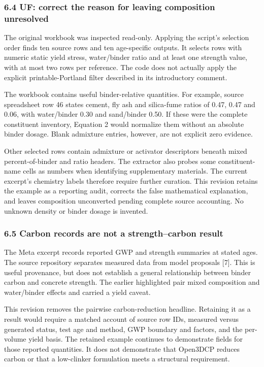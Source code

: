 \documentclass[
  american,
  11pt,
  letterpaper,
]{article}
\begin{document}
\subsubsection{6.4 UF: correct the reason for leaving composition
unresolved}\label{uf-correct-the-reason-for-leaving-composition-unresolved}

The original workbook was inspected read-only. Applying the script's
selection order finds ten source rows and ten age-specific outputs. It
selects rows with numeric static yield stress, water/binder ratio and at
least one strength value, with at most two rows per reference. The code
does not actually apply the explicit printable-Portland filter described
in its introductory comment.

The workbook contains useful binder-relative quantities. For example,
source spreadsheet row 46 states cement, fly ash and silica-fume ratios
of 0.47, 0.47 and 0.06, with water/binder 0.30 and sand/binder 0.50. If
these were the complete constituent inventory, Equation 2 would
normalize them without an absolute binder dosage. Blank admixture
entries, however, are not explicit zero evidence.

Other selected rows contain admixture or activator descriptors beneath
mixed percent-of-binder and ratio headers. The extractor also probes
some constituent-name cells as numbers when identifying supplementary
materials. The current excerpt's chemistry labels therefore require
further curation. This revision retains the example as a reporting
audit, corrects the false mathematical explanation, and leaves
composition unconverted pending complete source accounting. No unknown
density or binder dosage is invented.

\subsubsection{6.5 Carbon records are not a strength--carbon
result}\label{carbon-records-are-not-a-strengthcarbon-result}

The Meta excerpt records reported GWP and strength summaries at stated
ages. The source repository separates measured data from model proposals
{[}7{]}. This is useful provenance, but does not establish a general
relationship between binder carbon and concrete strength. The earlier
highlighted pair mixed composition and water/binder effects and carried
a yield caveat.

This revision removes the pairwise carbon-reduction headline. Retaining
it as a result would require a matched account of source row IDs,
measured versus generated status, test age and method, GWP boundary and
factors, and the per-volume yield basis. The retained example continues
to demonstrate fields for those reported quantities. It does not
demonstrate that Open3DCP reduces carbon or that a low-clinker
formulation meets a structural requirement.
\end{document}
